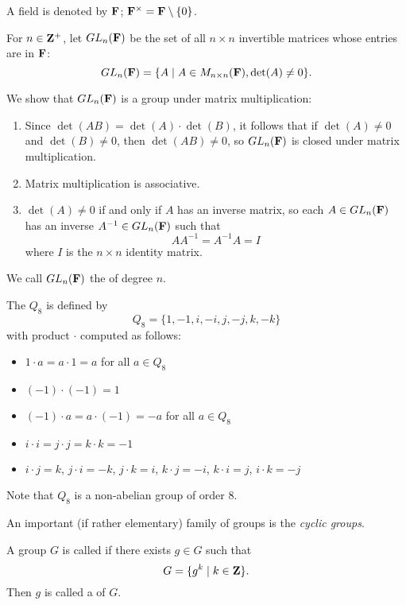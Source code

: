 \begin{example}

A field is denoted by $\mathbf F$; $\mathbf F^\times=\mathbf F\setminus\{0\}$.

For $n\in\mathbf Z^+$, let $GL_n(\mathbf F)$ be the set of all $n\times n$ invertible matrices whose entries are in $\mathbf F$:
\[GL_n(\mathbf F)=\{A\mid A\in M_{n\times n}(\mathbf F),\det(A)\neq0\}.\]

We show that $GL_n(\mathbf F)$ is a group under matrix multiplication:
\begin{enumerate}[label=(\roman*)]
\item Since $\det(AB)=\det(A)\cdot\det(B)$, it follows that if $\det(A)\neq0$ and $\det(B)\neq0$, then $\det(AB)\neq0$, so $GL_n(\mathbf F)$ is closed under matrix multiplication.
\item Matrix multiplication is associative.
\item $\det(A)\neq0$ if and only if $A$ has an inverse matrix, so each $A\in GL_n(\mathbf F)$ has an inverse $A^{-1}\in GL_n(\mathbf F)$ such that
\[AA^{-1}=A^{-1}A=I\]
where $I$ is the $n\times n$ identity matrix.
\end{enumerate}

We call $GL_n(\mathbf F)$ the  of degree $n$.
\end{example}

\begin{example}
The  $Q_8$ is defined by
\[Q_8=\{1,-1,i,-i,j,-j,k,-k\}\]
with product $\cdot$ computed as follows:
\begin{itemize}
\item $1\cdot a=a\cdot 1=a$ for all $a\in Q_8$
\item $(-1)\cdot(-1)=1$
\item $(-1)\cdot a=a\cdot(-1)=-a$ for all $a\in Q_8$
\item $i\cdot i=j\cdot j=k\cdot k=-1$
\item $i\cdot j=k$, $j\cdot i=-k$, $j\cdot k=i$, $k\cdot j=-i$, $k\cdot i=j$, $i\cdot k=-j$
\end{itemize}
Note that $Q_8$ is a non-abelian group of order $8$.
\end{example}

An important (if rather elementary) family of groups is the \emph{cyclic groups}.

\begin{definition}
A group $G$ is called  if there exists $g\in G$ such that
\[G=\{g^k\mid k\in\mathbf Z\}.\]
Then $g$ is called a  of $G$.
\end{definition}

